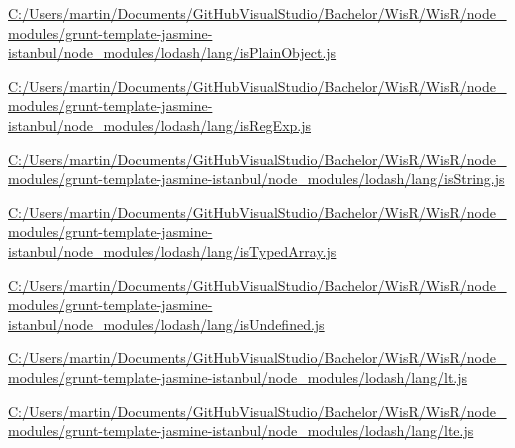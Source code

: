 \begin{DoxyCompactItemize}
\item 
\hyperlink{_c_1_2_users_2martin_2_documents_2_git_hub_visual_studio_2_bachelor_2_wis_r_2_wis_r_2node_module9fb4adda9ff854a6c3a4cd036c7c3911}{C\+:/\+Users/martin/\+Documents/\+Git\+Hub\+Visual\+Studio/\+Bachelor/\+Wis\+R/\+Wis\+R/node\+\_\+modules/grunt-\/template-\/jasmine-\/istanbul/node\+\_\+modules/lodash/lang/is\+Plain\+Object.\+js}
\item 
\hyperlink{_c_1_2_users_2martin_2_documents_2_git_hub_visual_studio_2_bachelor_2_wis_r_2_wis_r_2node_module85a2d408b7c584f794f184114bc9f4e9}{C\+:/\+Users/martin/\+Documents/\+Git\+Hub\+Visual\+Studio/\+Bachelor/\+Wis\+R/\+Wis\+R/node\+\_\+modules/grunt-\/template-\/jasmine-\/istanbul/node\+\_\+modules/lodash/lang/is\+Reg\+Exp.\+js}
\item 
\hyperlink{_c_1_2_users_2martin_2_documents_2_git_hub_visual_studio_2_bachelor_2_wis_r_2_wis_r_2node_modulee1694adb8cbdedb57a4f5b2bd1a8a912}{C\+:/\+Users/martin/\+Documents/\+Git\+Hub\+Visual\+Studio/\+Bachelor/\+Wis\+R/\+Wis\+R/node\+\_\+modules/grunt-\/template-\/jasmine-\/istanbul/node\+\_\+modules/lodash/lang/is\+String.\+js}
\item 
\hyperlink{_c_1_2_users_2martin_2_documents_2_git_hub_visual_studio_2_bachelor_2_wis_r_2_wis_r_2node_module7c8874505a5beddb7db51dab316a2ac0}{C\+:/\+Users/martin/\+Documents/\+Git\+Hub\+Visual\+Studio/\+Bachelor/\+Wis\+R/\+Wis\+R/node\+\_\+modules/grunt-\/template-\/jasmine-\/istanbul/node\+\_\+modules/lodash/lang/is\+Typed\+Array.\+js}
\item 
\hyperlink{_c_1_2_users_2martin_2_documents_2_git_hub_visual_studio_2_bachelor_2_wis_r_2_wis_r_2node_module0dbb8e81a31460d89444081c05e94236}{C\+:/\+Users/martin/\+Documents/\+Git\+Hub\+Visual\+Studio/\+Bachelor/\+Wis\+R/\+Wis\+R/node\+\_\+modules/grunt-\/template-\/jasmine-\/istanbul/node\+\_\+modules/lodash/lang/is\+Undefined.\+js}
\item 
\hyperlink{_c_1_2_users_2martin_2_documents_2_git_hub_visual_studio_2_bachelor_2_wis_r_2_wis_r_2node_module1753c01d35c34030d3e17eaea259477f}{C\+:/\+Users/martin/\+Documents/\+Git\+Hub\+Visual\+Studio/\+Bachelor/\+Wis\+R/\+Wis\+R/node\+\_\+modules/grunt-\/template-\/jasmine-\/istanbul/node\+\_\+modules/lodash/lang/lt.\+js}
\item 
\hyperlink{_c_1_2_users_2martin_2_documents_2_git_hub_visual_studio_2_bachelor_2_wis_r_2_wis_r_2node_moduleeeb1644726c802eb314faf4906f79839}{C\+:/\+Users/martin/\+Documents/\+Git\+Hub\+Visual\+Studio/\+Bachelor/\+Wis\+R/\+Wis\+R/node\+\_\+modules/grunt-\/template-\/jasmine-\/istanbul/node\+\_\+modules/lodash/lang/lte.\+js}

\end{DoxyCompactItemize}
